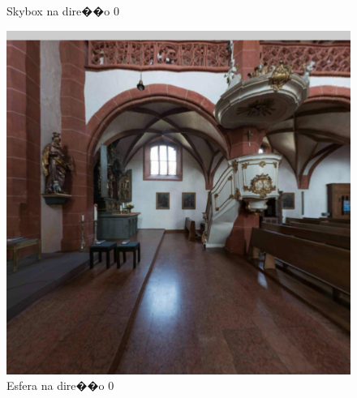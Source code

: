 \documentclass[12pt]{article}
\begin{document}
\begin{figure}[!tbp]
\begin{minipage}[b]{0.3\textwidth}
    \caption{Skybox na dire��o 0}
    \label{fig:skybox_direction_0}
  \end{minipage}
  \hfill
  \begin{minipage}[b]{0.3\textwidth}
    \centering
    \includegraphics[width=1.1\textwidth]{../images/screenshots/Screenshot_0_Sphere.jpg}
    \caption{Esfera na dire��o 0}
    \label{fig:sphere_direction_0}
  \end{minipage}
\end{figure}
\end{document}
